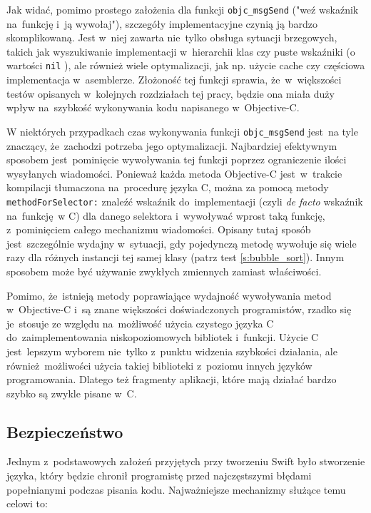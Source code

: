 \documentclass[mgr, shortabstract]{iithesis}
\newcommand{\objcinline}[1]{
    \texttt{#1}
}
\begin{document}
Jak widać, pomimo prostego założenia dla funkcji \objcinline{objc_msgSend} ("weź wskaźnik na~funkcję i~ją wywołaj"), szczegóły implementacyjne czynią ją bardzo skomplikowaną. Jest w~niej zawarta nie~tylko obsługa sytuacji brzegowych, takich jak wyszukiwanie implementacji w~hierarchii klas czy puste wskaźniki (o wartości \objcinline{nil}), ale również wiele optymalizacji, jak np. użycie cache czy częściowa implementacja w~asemblerze. Złożoność tej funkcji sprawia, że~w~większości testów opisanych w~kolejnych rozdziałach tej pracy, będzie ona miała duży wpływ na~szybkość wykonywania kodu napisanego w~Objective-C.

W niektórych przypadkach czas wykonywania funkcji \objcinline{objc_msgSend} jest~na tyle znaczący, że~zachodzi potrzeba jego optymalizacji. Najbardziej efektywnym sposobem jest~pominięcie wywoływania tej funkcji poprzez ograniczenie ilości wysyłanych wiadomości. Ponieważ każda metoda Objective-C jest~w~trakcie kompilacji tłumaczona na~procedurę języka C, można za pomocą metody \objcinline{methodForSelector:} znaleźć wskaźnik do~implementacji (czyli \textit{de facto} wskaźnik na~funkcję w C) dla danego selektora i~wywoływać wprost taką funkcję, z~pominięciem całego mechanizmu wiadomości. Opisany tutaj sposób jest~szczególnie wydajny w~sytuacji, gdy pojedynczą metodę wywołuje się wiele razy dla różnych instancji tej samej klasy (patrz test \ref{s:bubble_sort}). Innym sposobem może być używanie zwykłych zmiennych zamiast właściwości.

Pomimo, że~istnieją metody poprawiające wydajność wywoływania metod w~Objective-C i~są znane większości doświadczonych programistów, rzadko się je~stosuje ze względu na~możliwość użycia czystego języka C do~zaimplementowania niskopoziomowych bibliotek i~funkcji. Użycie C jest~lepszym wyborem nie~tylko z~punktu widzenia szybkości działania, ale również możliwości użycia takiej biblioteki z~poziomu innych języków programowania. Dlatego też fragmenty aplikacji, które mają działać bardzo szybko są zwykle pisane w~C.

\subsection{Bezpieczeństwo}

Jednym z~podstawowych założeń przyjętych przy tworzeniu Swift było stworzenie języka, który będzie chronił programistę przed najczęstszymi błędami popełnianymi podczas pisania kodu. Najważniejsze mechanizmy służące temu celowi to:
\end{document}
